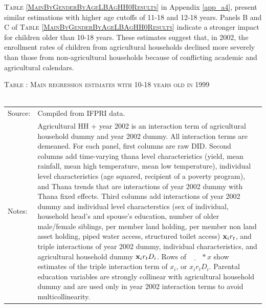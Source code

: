\documentclass[12pt,letterpaper]{article}
\newcommand{\bfx}{\ensuremath{\mbox{\bf x}}}
\newcommand{\0}{\ensuremath{\mbox{\boldmath $0$}}}
\begin{document}
\textsc{\small Table \ref{MainByGenderByAgeLBAgHH0Results}} in Appendix \ref{app_a4}, present similar estimations with higher age cutoffs of 11-18 and 12-18 years. Panels B and C of \textsc{Table \ref{MainByGenderByAgeLBAgHH0Results}} indicate a stronger impact for children older than 10-18 years. These estimates suggest that, in 2002, the enrollment rates of children from agricultural households declined more severely than those from non-agricultural households because of conflicting academic and agricultural calendars.


\begin{table}\hfil\textsc{\footnotesize Table \thetable: Main regression estimates with 10-18 years old in 1999\label{base10}}\\\setlength{\tabcolsep}{.5pt}\renewcommand{\arraystretch}{.675}\hspace{-2em}\hfil\\\renewcommand{\arraystretch}{1}\hfil\begin{tabular}{>{\hfill\scriptsize}p{1cm}<{}>{\scriptsize}p{12cm}<{\hfill}} Source:& Compiled from IFPRI data. \\[-1ex] Notes:&   \textsf{Agricultural HH + year 2002} is an interaction term of agricultural household dummy and year 2002 dummy. All interaction terms are demeaned. For each panel, first columns are raw DID. Second columns add time-varying thana level characteristics (yield, mean rainfall, mean high temperature, mean low temperature), individual level characteristics (age squared, recipient of a poverty program), and \textsf{Thana trends} that are interactions of year 2002 dummy with Thana fixed effects. Third columns add interactions of year 2002 dummy and individual level characterstics (sex of individual, household head's and spouse's education, number of older male/female siblings, per member land holding, per member non land asset holding, piped water access, structured toilet access) $\bfx_{i}r_{t}$, and triple interactions of year 2002 dummy, individual characteristics, and agricultural household dummy $\bfx_{i}r_{t}D_{i}$. Rows of $\underline{\phantom{mm}}*x$ show estimates of the triple interaction term of $x_{i}$, or $x_{i}r_{t}D_{i}$. Parental education variables are strongly collinear with agricultural household dummy and are used only in year 2002 interaction terms to avoid multicollinearity.  \end{tabular} \end{table}
\end{document}
